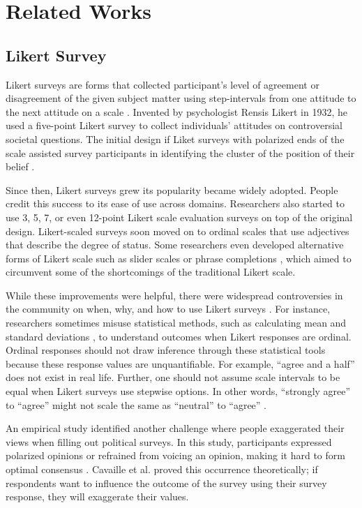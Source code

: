 \section{Related Works} \label{related_works}

\subsection{Likert Survey}
Likert surveys are forms that collected participant's level of agreement or disagreement of the given subject matter using step-intervals from one attitude to the next attitude on a scale \cite{likert1932technique}. Invented by psychologist Rensis Likert in 1932, he used a five-point Likert survey to collect individuals' attitudes on controversial societal questions. The initial design if Liket surveys with polarized ends of the scale assisted survey participants in identifying the cluster of the position of their belief \cite{joshi2015likert}. 

Since then, Likert surveys grew its popularity became widely adopted. People credit this success to its ease of use across domains. Researchers also started to use 3, 5, 7, or even 12-point Likert scale evaluation surveys \cite{garland2008computer,finstad2010} on top of the original design. Likert-scaled surveys soon moved on to ordinal scales that use adjectives that describe the degree of status. Some researchers even developed alternative forms of Likert scale such as slider scales \cite{roster2015exploring} or phrase completions \cite{hodge2003phrase}, which aimed to circumvent some of the shortcomings of the traditional Likert scale.

While these improvements were helpful, there were widespread controversies in the community on when, why, and how to use Likert surveys \cite{bishop2015use}. For instance, researchers sometimes misuse statistical methods, such as calculating mean and standard deviations \cite{jamieson2004likert}, to understand outcomes when Likert responses are ordinal. Ordinal responses should not draw inference through these statistical tools because these response values are unquantifiable. For example, ``agree and a half'' does not exist in real life. Further, one should not assume scale intervals to be equal when Likert surveys use stepwise options. In other words, ``strongly agree'' to ``agree'' might not scale the same as ``neutral'' to ``agree'' \cite{jamieson2004likert, edmondson2005likert}.

An empirical study \cite{quarfoot2017quadratic} identified another challenge where people exaggerated their views when filling out political surveys. In this study, participants expressed polarized opinions or refrained from voicing an opinion, making it hard to form optimal consensus \cite{posner2018radical}. Cavaille et al. \cite{cavaille2018towards}  proved this occurrence theoretically; if respondents want to influence the outcome of the survey using their survey response, they will exaggerate their values.

